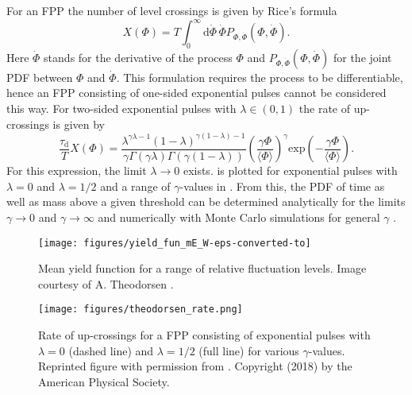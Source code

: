 For an FPP the number of level crossings is given by Rice's formula \cite{rice1945mathematical}
\begin{equation}
	X(\Phi) = T\int_{0}^{\infty} \mathrm{d}\dot{\Phi}\, \dot{\Phi}P_{\Phi,\dot{\Phi}}\left(\Phi,\dot{\Phi}\right).
\end{equation}
Here $\dot{\Phi}$ stands for the derivative of the process $\Phi$ and $P_{\Phi,\dot{\Phi}}\left(\Phi,\dot{\Phi}\right)$ for the joint PDF between $\Phi$ and $\dot{\Phi}$. This formulation requires the process to be differentiable, hence an FPP consisting of one-sided exponential pulses cannot be considered this way. For two-sided exponential pulses with $\lambda \in (0,1)$ the rate of up-crossings is given by \cite{theodorsen2018level}
\begin{equation}\label{rate}
	\frac{\tau_\mathrm{d}}{T}X(\Phi) = \frac{\lambda^{\gamma\lambda-1}(1-\lambda)^{\gamma(1-\lambda)-1}}{\gamma\Gamma(\gamma\lambda)\Gamma(\gamma(1-\lambda))}\left(\frac{\gamma\Phi}{\langle\Phi\rangle}\right)^\gamma\mathrm{exp}\left(-\frac{\gamma\Phi}{\langle\Phi\rangle}\right).
\end{equation}
For this expression, the limit $\lambda\rightarrow0$ exists.  is plotted for exponential pulses with $\lambda=0$ and $\lambda=1/2$ and a range of $\gamma$-values in . From this, the PDF of time as well as mass above a given threshold can be determined analytically for the limits $\gamma\rightarrow 0$ and $\gamma\rightarrow \infty$  and numerically with Monte Carlo simulations for general $\gamma$ \cite{theodorsen2018level}. 
\begin{figure}
	\centering
	\begin{minipage}{.48\linewidth}
		\texttt{[image: figures/yield\_fun\_mE\_W-eps-converted-to]}
		\caption{Mean yield  function for a range of relative fluctuation levels. Image courtesy of A. Theodorsen \cite{theodorsen2018statistical}.}
		\label{Fig:theodorsen_yield}
	\end{minipage}
	\hfill
	\begin{minipage}{.48\linewidth}
		\texttt{[image: figures/theodorsen\_rate.png]}
		\caption{Rate of up-crossings for a FPP consisting of exponential pulses with $\lambda=0$ (dashed line) and $\lambda=1/2$ (full line) for various $\gamma$-values. Reprinted figure with permission from \cite{theodorsen2018level}. Copyright (2018) by the American Physical Society.}
		\label{Fig:theodorsen_avtime}
	\end{minipage}
\end{figure}

